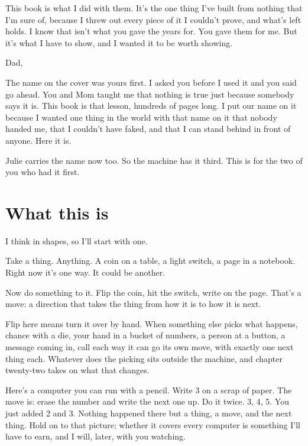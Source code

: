 \documentclass[11pt,twoside]{article}
\theoremstyle{thielethm}
\theoremstyle{thieledef}
\theoremstyle{thieledef}
\theoremstyle{thieledef}
\theoremstyle{thielethm}
\theoremstyle{thieleobs}
\theoremstyle{thielethm}
\begin{document}
This book is what I did with them. It's the one thing I've built from nothing that I'm sure of,
because I threw out every piece of it I couldn't prove, and what's left holds. I know that isn't
what you gave the years for. You gave them for me. But it's what I have to show, and I wanted it
to be worth showing.

\vspace{14pt}
\noindent Dad,

The name on the cover was yours first. I asked you before I used it and you said go ahead. You
and Mom taught me that nothing is true just because somebody says it is. This book is that
lesson, hundreds of pages long. I put our name on it because I wanted one thing in the world
with that name on it that nobody handed me, that I couldn't have faked, and that I can stand
behind in front of anyone. Here it is.

Julie carries the name now too. So the machine has it third. This is for the two of you who had
it first.
\endgroup
\cleardoublepage
\pagestyle{book}
\hypersetup{pageanchor=true}

\tableofcontents
\clearpage


\section*{What this is}
\label{sec:what}

I think in shapes, so I'll start with one.

Take a thing. Anything. A coin on a table, a light switch, a page in a notebook. Right now it's one way. It could be another.

Now do something to it. Flip the coin, hit the switch, write on the page. That's a move: a direction that takes the thing from how it is to how it is next.

Flip here means turn it over by hand. When something else picks what happens, chance with a die, your hand in a bucket of numbers, a person at a button, a message coming in, call each way it can go its own move, with exactly one next thing each. Whatever does the picking sits outside the machine, and chapter twenty-two takes on what that changes.

Here's a computer you can run with a pencil. Write 3 on a scrap of paper. The move is: erase the number and write the next one up. Do it twice. 3, 4, 5. You just added 2 and 3. Nothing happened there but a thing, a move, and the next thing. Hold on to that picture; whether it covers every computer is something I'll have to earn, and I will, later, with you watching.
\end{document}
